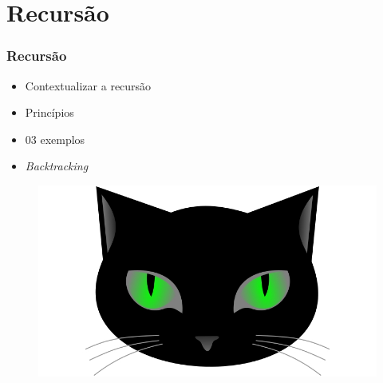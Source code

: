 
\section{Recursão}


\begin{frame}
\frametitle{Recursão}
\begin{minipage}{0.47\textwidth}
    \begin{itemize}
        \item Contextualizar a recursão
        \item Princípios
        \item 03 exemplos
        \item \textit{Backtracking}
    \end{itemize}
\end{minipage}
\begin{minipage}{0.5\textwidth}
\begin{figure}[ht!]
\begin{center}
\includegraphics[width=1.2\textwidth, height=0.40\textheight]{figures/logo_picat_alex.jpg}
\end{center}
\end{figure}
\end{minipage}
\end{frame}



